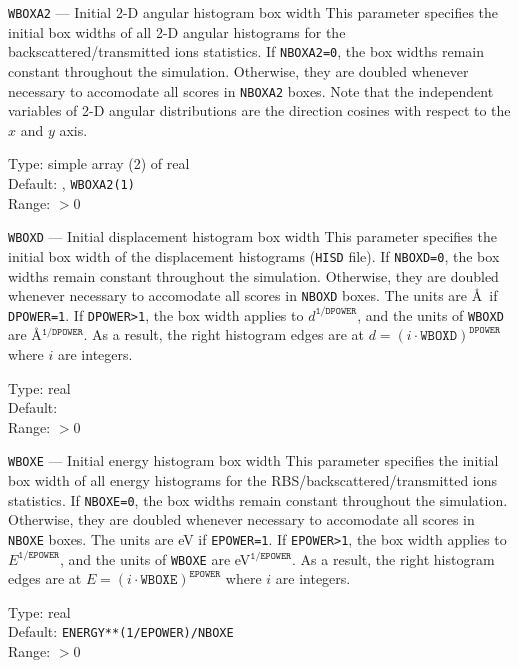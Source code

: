 \begin{keydescription}{\texttt{WBOXA2} --- Initial 2-D angular histogram box width}
%
  This parameter specifies the initial box widths of all 2-D angular histograms
  for the backscattered/transmitted ions statistics. If \texttt{NBOXA2=0}, the
  box widths remain constant throughout the simulation. Otherwise, they are doubled
  whenever necessary to accomodate all scores in \texttt{NBOXA2} boxes. Note
  that the independent variables of 2-D angular distributions are the direction
  cosines with respect to the $x$ and $y$ axis.
  \begin{keytab}
    Type:    \> simple array (2) of real \\
    Default: , \texttt{WBOXA2(1)} \\
    Range:   \> $> 0$
  \end{keytab}
\end{keydescription}

\begin{keydescription}{\texttt{WBOXD} --- Initial displacement histogram box width}
%
  This parameter specifies the initial box width of the displacement histograms 
  (\texttt{HISD} file). If \texttt{NBOXD=0}, the box widths remain constant
  throughout the simulation. Otherwise, they are doubled whenever necessary
  to accomodate all scores in \texttt{NBOXD} boxes. The units are \AA\ if
  \texttt{DPOWER=1}. If \texttt{DPOWER>1}, the box width applies to 
  $d^\texttt{1/DPOWER}$, and the units of \texttt{WBOXD} are
  \AA$^\texttt{1/DPOWER}$. As a result, the right histogram edges are at
  $d = (i \cdot \texttt{WBOXD})^\texttt{DPOWER}$ where $i$ are integers.
  \begin{keytab}
    Type:    \> real \\
    Default:  \\
    Range:   \> $> 0$
  \end{keytab}
\end{keydescription}

\begin{keydescription}{\texttt{WBOXE} --- Initial energy histogram box width}
%
  This parameter specifies the initial box width of all energy histograms for the 
  RBS/backscattered/transmitted ions statistics. If \texttt{NBOXE=0}, the box
  widths remain constant throughout the simulation. Otherwise, they are doubled
  whenever necessary to accomodate all scores in \texttt{NBOXE} boxes. The
  units are eV if \texttt{EPOWER=1}. If \texttt{EPOWER>1}, the box width applies to
  $E^\texttt{1/EPOWER}$, and the units of \texttt{WBOXE} are
  eV$^\texttt{1/EPOWER}$. As a result, the right histogram edges are at
  $E = (i \cdot \texttt{WBOXE})^\texttt{EPOWER}$ where $i$ are integers.
  \begin{keytab}
    Type:    \> real \\
    Default: \> \texttt{ENERGY**(1/EPOWER)/NBOXE} \\
    Range:   \> $> 0$
  \end{keytab}
\end{keydescription}

